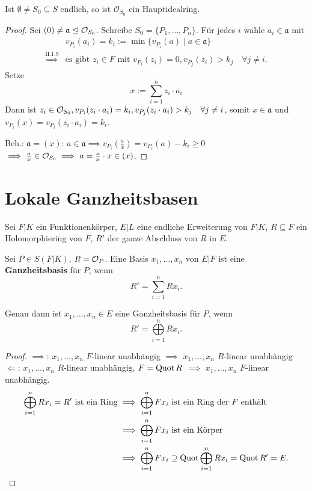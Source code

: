 \begin{satz}
    Ist $\emptyset \ne S_0 \subseteq S$ endlich, so ist $\mathcal{O}_{S_0}$ ein Hauptidealring.
\end{satz}
\begin{proof}
    Sei $(0) \ne \mathfrak{a} \trianglelefteq \mathcal{O}_{S_0}$. Schreibe $S_0 = \{P_1, \ldots, P_n\}$.
    Für jedes $i$ wähle $a_i \in \mathfrak{a}$ mit
    \begin{align*}
        & v_{P_i}(a_i) = k_i := \min \{v_{P_i}(a) \mid a \in \mathfrak{a}\}\\
        \stackrel{\text{II.1.9}}{\implies} & \text{es gibt } z_i \in F \text{ mit } v_{P_i}(z_i) = 0, v_{P_j}(z_i) > k_j \quad \forall j\ne i.
    \end{align*} 
    Setze $$x := \sum\limits_{i=1}^n z_i \cdot a_i$$
    Dann ist $z_i \in \mathcal{O}_{S_0}, v_{P_i}(z_i \cdot a_i) = k_i, v_{P_j}(z_i \cdot a_i) > k_j \quad \forall j \ne i$,
    somit $x \in \mathfrak{a}$ und $v_{P_i}(x) = v_{P_i}(z_i\cdot a_i) = k_i$.

    Beh.: $\mathfrak{a} = (x)$: $a \in \mathfrak{a} \implies v_{P_i}(\frac{a}{x}) = v_{P_i}(a) - k_i \geq 0$
    $\implies \frac{a}{x} \in \mathcal{O}_{S_0} \implies a = \frac{a}{x} \cdot x \in (x)$.
\end{proof}

\section{Lokale Ganzheitsbasen}
Sei $F|K$ ein Funktionenkörper, $E|L$ eine endliche Erweiterung von $F|K$, $R \subseteq F$ ein Holomorphiering von $F$,
$R'$ der ganze Abschluss von $R$ in $E$.

\begin{definition}
    Sei $P \in S(F|K)$, $R = \mathcal{O}_P$. Eine Basis $x_1, \ldots, x_n$ von $E|F$ ist eine \textbf{Ganzheitsbasis} für $P$, wenn
    $$ R' = \sum\limits_{i=1}^n R x_i. $$
\end{definition}

\begin{lemma}
    Genau dann ist $x_1,\ldots,x_n\in E$ eine Ganzheitsbasis für $P$, wenn $$R' = \bigoplus\limits_{i=1}^n R x_i.$$
\end{lemma}
\begin{proof}
    $\implies$: $x_1, \ldots, x_n$ $F$-linear unabhängig $\implies$ $x_1, \ldots, x_n$ $R$-linear unabhängig\\
    $\Longleftarrow$: $x_1,\ldots,x_n$ $R$-linear unabhängig, $F=\operatorname{Quot} R$ $\implies$ $x_1,\ldots,x_n$ $F$-linear unabhängig.
    \begin{align*}
        \bigoplus\limits_{i=1}^n Rx_i = R' \text{ ist ein Ring} & \implies \bigoplus\limits_{i=1}^n Fx_i \text{ ist ein Ring der }F \text{ enthält}\\
        & \implies \bigoplus\limits_{i=1}^n Fx_i \text{ ist ein Körper} \\
        & \implies \bigoplus\limits_{i=1}^n Fx_i \supseteq \operatorname{Quot} \bigoplus\limits_{i=1}^n Rx_i = \operatorname{Quot} R' = E.
    \end{align*}
\end{proof}

